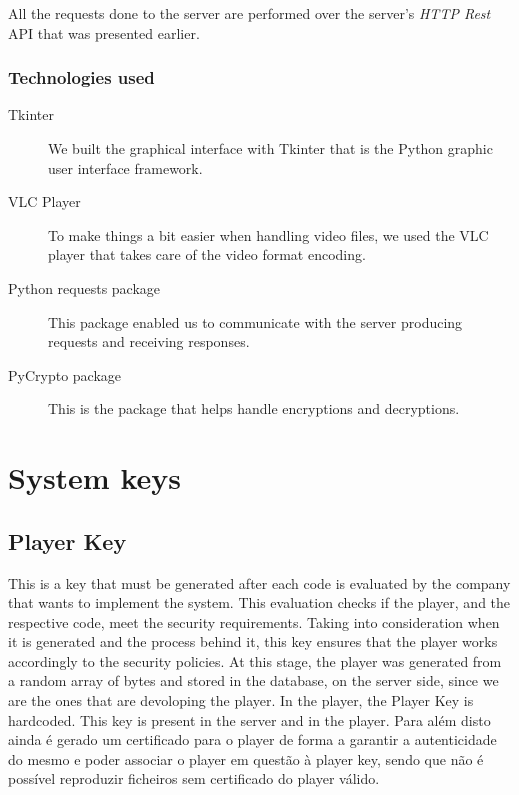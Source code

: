 \documentclass[11pt,a4paper]{report}
\begin{document}
All the requests done to the server are performed over the server's \emph{HTTP Rest} API that was presented earlier.

\subsection{Technologies used}
\begin{description}
  \item[Tkinter] We built the graphical interface with Tkinter that is the Python graphic user interface framework.
  \item[VLC Player] To make things a bit easier when handling video files, we used the VLC player that takes care of the video format encoding.
  \item[Python requests package] This package enabled us to communicate with the server producing requests and receiving responses.
  \item[PyCrypto package] This is the package that helps handle encryptions and decryptions.
\end{description}

\chapter{System keys}
\section{Player Key}
This is a key that must be generated after each code is evaluated by the company that wants to implement the system. 
This evaluation checks if the player, and the respective code, meet the security requirements. 
Taking into consideration when it is generated and the process behind it, this key ensures that the player works accordingly to the security policies.
\newline At this stage, the player was generated from a random array of bytes and stored in the database, on the server side, since we are the ones that are devoloping the player.
In the player, the Player Key is hardcoded.
\newline This key is present in the server and in the player.
Para além disto ainda é gerado um certificado para o player de forma a garantir a autenticidade do mesmo e poder associar o player em questão à player key, sendo que não é possível reproduzir ficheiros sem certificado do player válido.
\end{document}
